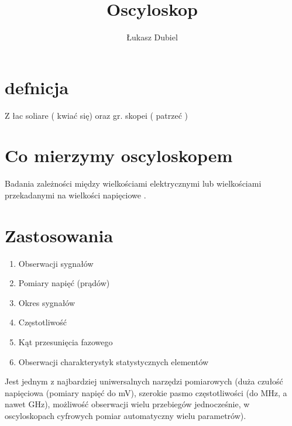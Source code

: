 \documentclass[11pt]{article}
\author{Łukasz Dubiel}
\title{Oscyloskop}
\begin{document}
\maketitle

\section{defnicja}
Z łac soliare ( kwiać się) oraz gr. skopei ( patrzeć ) 

\section{Co mierzymy oscyloskopem}
Badania zależności między wielkościami elektrycznymi lub wielkościami przekadanymi na wielkości napięciowe .

\section{Zastosowania}
\begin{enumerate}
\item{Obserwacji sygnałów}
\item{Pomiary napięć (prądów)}
\item{Okres sygnałów}
\item{Częstotliwość}
\item{Kąt przesunięcia fazowego}
\item{Obserwacji charakterystyk statystycznych elementów}
\end{enumerate}
Jest jednym z najbardziej uniwersalnych narzędzi pomiarowych (duża czułość napięciowa (pomiary napięć do mV), szerokie pasmo częstotliwości (do MHz, a nawet GHz), możliwość obserwacji wielu przebiegów jednocześnie, w oscyloskopach cyfrowych pomiar automatyczny wielu parametrów).
\end{document}
